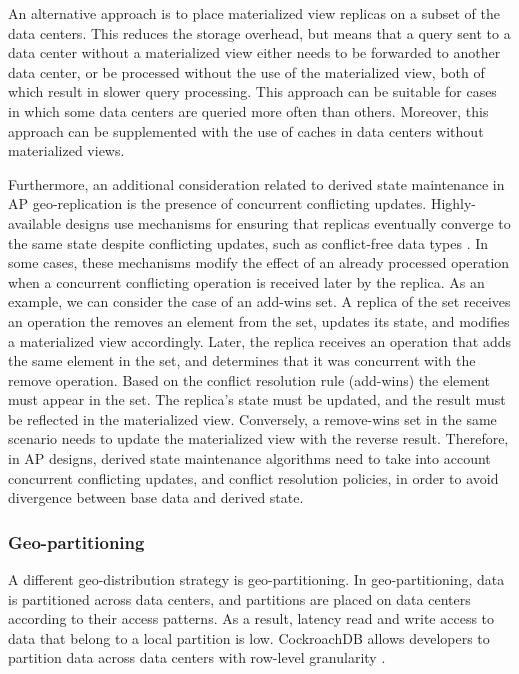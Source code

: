 An alternative approach is to place materialized view replicas on a subset of the data centers.
This reduces the storage overhead, but means that a query sent to a data center without a materialized view
either needs to be forwarded to another data center, or be processed without the use of the materialized view,
both of which result in slower query processing.
This approach can be suitable for cases in which some data centers are queried more often than others.
Moreover, this approach can be supplemented with the use of caches in data centers without materialized
views.

Furthermore, an additional consideration related to derived state maintenance in AP geo-replication
is the presence of concurrent conflicting updates.
Highly-available designs use mechanisms for ensuring that replicas eventually converge to the same state despite
conflicting updates, such as conflict-free data types \cite{Shapiro2011CRDTs}.
In some cases, these mechanisms modify the effect of an already processed operation when a concurrent conflicting operation
is received later by the replica.
As an example, we can consider the case of an add-wins set.
A replica of the set receives an operation the removes an element from the set, updates its state,
and modifies a materialized view accordingly.
Later, the replica receives an operation that adds the same element in the set, and determines that it was concurrent with the
remove operation.
Based on the conflict resolution rule (add-wins) the element must appear in the set.
The replica's state must be updated, and the result must be reflected in the materialized view.
Conversely, a remove-wins set in the same scenario needs to update the materialized view with the reverse result.
Therefore, in AP designs, derived state maintenance algorithms need to take into account concurrent conflicting updates,
and conflict resolution policies, in order to avoid divergence between base data and derived state.

\subsubsection{Geo-partitioning}
A different geo-distribution strategy is geo-partitioning.
In geo-partitioning, data is partitioned across data centers, and partitions are placed on data centers according to
their access patterns.
As a result, latency read and write access to data that belong to a local partition is low.
CockroachDB allows developers to partition data across data centers with row-level granularity
\cite{cockroachdb:geopartitioning}.

